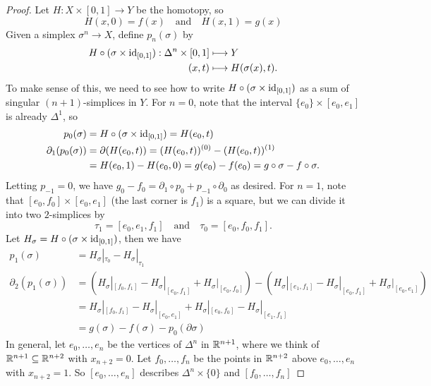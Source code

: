 \begin{proof}
  Let $H : X \times [0, 1] \to Y$ be the homotopy, so
  \[H(x, 0) = f(x) \quad \text{and} \quad H(x, 1) = g(x)\]
  Given a simplex $\sigma^n \to X$, define
  $p_n(\sigma)$ by
  \begin{align*}
    H \circ (\sigma \times \operatorname{id}_{[0, 1]})
    : \Delta^n \times [0, 1]
    &\longmapsto Y \\
    (x, t) &\longmapsto H(\sigma(x), t).
  \end{align*}
  To make sense of this, we need to see how to write
  $H \circ (\sigma \times \operatorname{id}_{[0, 1]})$ as a sum of
  singular $(n + 1)$-simplices in $Y$.
  For $n = 0$, note that the interval $\{e_0\} \times [e_0, e_1]$ is
  already $\Delta^1$, so
  \begin{align*}
    p_0(\sigma)
    &= H \circ (\sigma \times \operatorname{id}_{[0, 1]})
    = H(e_0, t) \\
    \partial_1 (p_0(\sigma))
    &= \partial(H(e_0, t))
    = (H(e_0, t))^{(0)} - (H(e_0, t))^{(1)} \\
    &= H(e_0, 1) - H(e_0, 0)
    = g(e_0) - f(e_0) = g \circ \sigma - f \circ \sigma.
  \end{align*}
  Letting $p_{-1} = 0$, we have
  $g_0 - f_0 = \partial_1 \circ p_0 + p_{-1} \circ \partial_0$ as
  desired.
  For $n = 1$, note that $[e_0, f_0] \times [e_0, e_1]$
  (the last corner is $f_1$) is a square, but we
  can divide it into two $2$-simplices by
  \[
    \tau_1 = [e_0, e_1, f_1] \quad \text{and} \quad
    \tau_0 = [e_0, f_0, f_1].
  \]
  Let $H_\sigma = H \circ (\sigma \times \operatorname{id}_{[0, 1]})$,
  then we have
  \begin{align*}
    p_1(\sigma)
    &= H_\sigma|_{\tau_0} - H_\sigma|_{\tau_1} \\
    \partial_2 (p_1(\sigma))
    &= (H_\sigma|_{[f_0, f_1]} - H_\sigma|_{[e_0, f_1]} + H_\sigma|_{[e_0, f_0]})
    - (H_\sigma|_{[e_1, f_1]} - H_\sigma|_{[e_0, f_1]} + H_\sigma|_{[e_0, e_1]}) \\
    &= H_\sigma|_{[f_0, f_1]}
    - H_\sigma|_{[e_0, e_1]}
    + H_\sigma|_{[e_0, f_0]}
    - H_\sigma|_{[e_1, f_1]} \\
    &= g(\sigma) - f(\sigma) - p_0(\partial \sigma)
  \end{align*}
  In general, let $e_0, \dots, e_n$ be the
  vertices of $\Delta^n$ in $\mathbb{R}^{n + 1}$, where
  we think of $\mathbb{R}^{n + 1} \subseteq \mathbb{R}^{n + 2}$
  with $x_{n + 2} = 0$. Let $f_0, \dots, f_n$
  be the points in $\mathbb{R}^{n + 2}$ above
  $e_0, \dots, e_n$ with $x_{n + 2} = 1$.
  So $[e_0, \dots, e_n]$ describes
  $\Delta^n \times \{0\}$ and $[f_0, \dots, f_n]$

\end{proof}

